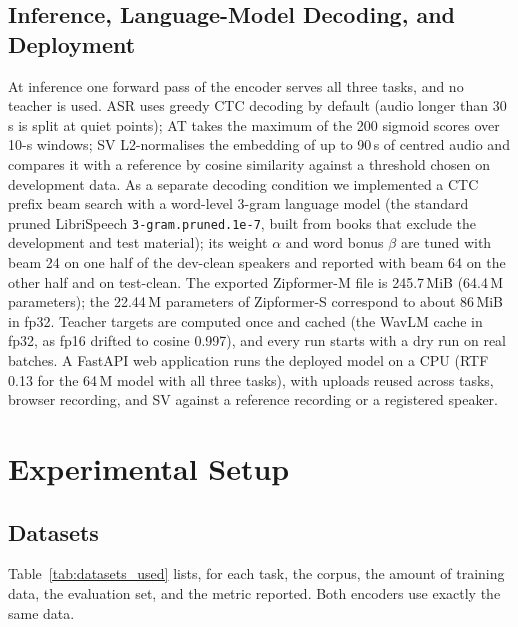 \documentclass[lettersize,journal]{IEEEtran}
\begin{document}
\subsection{Inference, Language-Model Decoding, and Deployment}\label{sec:lmdec}
At inference one forward pass of the encoder serves all three tasks, and no teacher is used. ASR uses greedy CTC
decoding by default (audio longer than 30\,s is split at quiet points); AT takes the maximum of the 200 sigmoid scores
over 10-s windows; SV L2-normalises the embedding of up to 90\,s of centred audio and compares it with a reference by
cosine similarity against a threshold chosen on development data. As a separate decoding condition we implemented a
CTC prefix beam search with a word-level 3-gram language model (the standard pruned LibriSpeech
\texttt{3-gram.pruned.1e-7}, built from books that exclude the development and test material); its weight $\alpha$
and word bonus $\beta$ are tuned with beam 24 on one half of the dev-clean speakers and reported with beam 64 on the
other half and on test-clean. The exported Zipformer-M file is 245.7\,MiB (64.4\,M parameters); the 22.44\,M
parameters of Zipformer-S correspond to about 86\,MiB in fp32. Teacher targets are computed once and cached (the
WavLM cache in fp32, as fp16 drifted to cosine 0.997), and every run starts with a dry run on real batches. A FastAPI
web application runs the deployed model on a CPU (RTF 0.13 for the 64\,M model with all three tasks), with uploads
reused across tasks, browser recording, and SV against a reference recording or a registered speaker.

\section{Experimental Setup}\label{sec:setup}

\subsection{Datasets}
Table~\ref{tab:datasets_used} lists, for each task, the corpus, the amount of training data, the evaluation set, and
the metric reported. Both encoders use exactly the same data.
\end{document}
